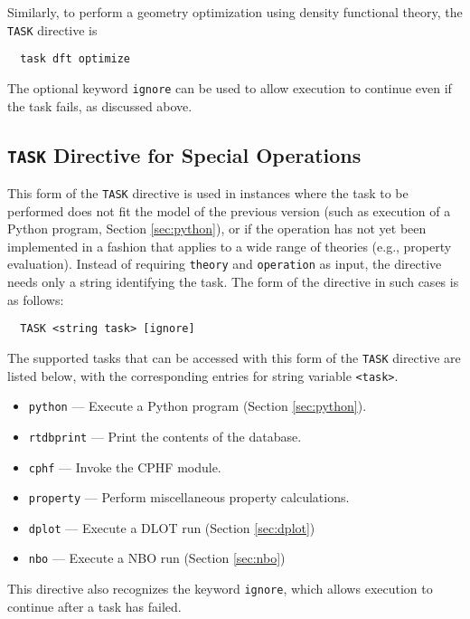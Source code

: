 Similarly, to perform a geometry optimization using density functional
theory, the \verb+TASK+ directive is
\begin{verbatim}
  task dft optimize
\end{verbatim}

The optional keyword \verb+ignore+ can be used to allow execution to
continue even if the task fails, as discussed above.

\subsection{{\tt TASK} Directive for Special Operations}

This form of the \verb+TASK+ directive is used in instances where the
task to be performed does not fit the model of the previous version
(such as execution of a Python program, Section \ref{sec:python}), or
if the operation has not yet been implemented in a fashion that
applies to a wide range of theories (e.g., property evaluation).
Instead of requiring \verb+theory+ and \verb+operation+ as input, the
directive needs only a string identifying the task.  The form of the
directive in such cases is as follows:

\begin{verbatim}
  TASK <string task> [ignore]
\end{verbatim}

The supported tasks that can be accessed with this form of the \verb+TASK+
directive are listed
below, with the corresponding entries for string variable \verb+<task>+.

\begin{itemize}
  \item \verb+python+ --- Execute a Python program (Section \ref{sec:python}).
  \item \verb+rtdbprint+ --- Print the contents of the database.
  \item \verb+cphf+ --- Invoke the CPHF module.
  \item \verb+property+ --- Perform miscellaneous property calculations.
  \item \verb+dplot+ --- Execute a DLOT run (Section \ref{sec:dplot})
  \item \verb+nbo+ --- Execute a NBO run (Section \ref{sec:nbo})
\end{itemize}

This directive also recognizes the keyword \verb+ignore+, which allows
execution to continue after a task has failed.


